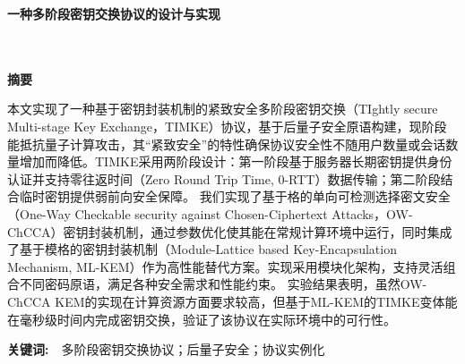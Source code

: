 \setcounter{page}{1}
\begin{center}
  {\heiti\bfseries 一种多阶段密钥交换协议的设计与实现}
  \\ \hspace*{\fill}
  \\ \hspace*{\fill} \\
   \bfseries 摘\quad 要
\end{center}
  \bigskip
\begin{spacing}{1.5}  
  本文实现了一种基于密钥封装机制的紧致安全多阶段密钥交换（TIghtly secure Multi-stage Key Exchange，TIMKE）协议，基于后量子安全原语构建，现阶段能抵抗量子计算攻击，其“紧致安全”的特性确保协议安全性不随用户数量或会话数量增加而降低。TIMKE采用两阶段设计：第一阶段基于服务器长期密钥提供身份认证并支持零往返时间（Zero Round Trip Time, 0-RTT）数据传输；第二阶段结合临时密钥提供弱前向安全保障。
  我们实现了基于格的单向可检测选择密文安全（One-Way Checkable security against Chosen-Ciphertext Attacks，OW-ChCCA）密钥封装机制，通过参数优化使其能在常规计算环境中运行，同时集成了基于模格的密钥封装机制（Module-Lattice based Key-Encapsulation Mechanism, ML-KEM）作为高性能替代方案。实现采用模块化架构，支持灵活组合不同密码原语，满足各种安全需求和性能约束。
  实验结果表明，虽然OW-ChCCA KEM的实现在计算资源方面要求较高，但基于ML-KEM的TIMKE变体能在毫秒级时间内完成密钥交换，验证了该协议在实际环境中的可行性。
\end{spacing}
    \medskip
  {\heiti \bfseries 关键词:}\ \ 多阶段密钥交换协议；后量子安全；协议实例化
\newpage